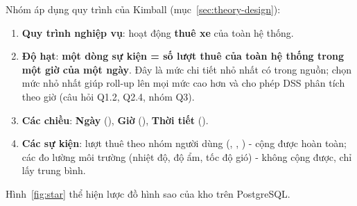 \newpage
{}\label{sec:dwdesign}

Nhóm áp dụng quy trình của Kimball (mục~\ref{sec:theory-design}):
\begin{enumerate}
    \item \textbf{Quy trình nghiệp vụ}: hoạt động \textbf{thuê xe} của toàn hệ thống.
    \item \textbf{Độ hạt}: \textbf{một dòng sự kiện = số lượt thuê của toàn hệ thống trong một giờ của một ngày}. Đây là mức chi tiết nhỏ nhất có trong nguồn; chọn mức nhỏ nhất giúp roll-up lên mọi mức cao hơn và cho phép DSS phân tích theo giờ (câu hỏi Q1.2, Q2.4, nhóm Q3).
    \item \textbf{Các chiều}: \textbf{Ngày} (), \textbf{Giờ} (), \textbf{Thời tiết} ().
    \item \textbf{Các sự kiện}: lượt thuê theo nhóm người dùng (, , ) - cộng được hoàn toàn; các đo lường môi trường (nhiệt độ, độ ẩm, tốc độ gió) - không cộng được, chỉ lấy trung bình.
\end{enumerate}

Hình~\ref{fig:star} thể hiện lược đồ hình sao của kho  trên PostgreSQL.


